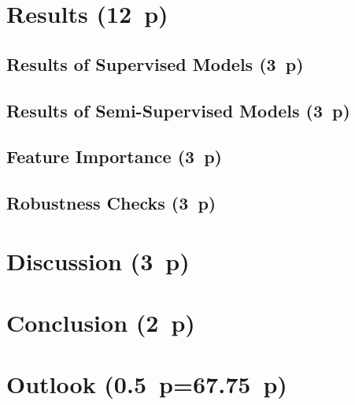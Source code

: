 \newpage
\section{Results (12~p)}\label{results}

\subsection{Results of Supervised
  Models (3~p)}\label{results-of-supervised-models}

\subsection{Results of Semi-Supervised
  Models (3~p)}\label{results-of-semi-supervised-models}

\subsection{Feature Importance (3~p)}\label{feature-importance}

\subsection{Robustness Checks (3~p)}\label{robustness-checks}

\newpage
\section{Discussion (3~p)}\label{discussion}

\newpage
\section{Conclusion (2~p)}\label{conclusion}

\newpage
\section{Outlook (0.5~p=67.75~p)}\label{outlook}

